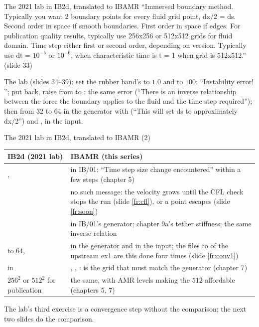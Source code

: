 \documentclass[aspectratio=169,11pt]{beamer}
\begin{document}
\begin{frame}[fragile]{The 2021 lab in IB2d, translated to IBAMR}
\label{fr:lab}
\footnotesize ``Immersed boundary method. Typically you want 2 boundary points for every fluid grid point, dx/2 = ds. Second order in space if smooth boundaries. First order in space if edges. For publication quality results, typically use 256x256 or 512x512 grids for fluid domain. Time step either first or second order, depending on version. Typically use dt = $10^{-5}$ or $10^{-6}$, when characteristic time is t = 1 when grid is 512x512.'' (slide 33)
\vspace{1mm}

\footnotesize The lab (slides 34--39): set the rubber band's  to $1.0$ and  to $100$: ``Instability error! ''; put  back, raise  from  to : the same error (``There is an inverse relationship between the force the boundary applies to the fluid and the time step required''); then  from $32$ to $64$ in the generator with  (``This will set ds to approximately dx/2'') and ,  in the input.

\end{frame}

\begin{frame}[fragile]{The 2021 lab in IB2d, translated to IBAMR (2)}
\label{fr:lab2}
\scriptsize
\setlength{\tabcolsep}{3pt}
\begin{tabular}{@{}L{0.42\textwidth}L{0.52\textwidth}@{}}
\toprule
IB2d (2021 lab) & IBAMR (this series)\\
\midrule
{},  &  in IB/01: ``Time step size change encountered'' within a few steps (chapter 5)\\
 & no such message: the velocity grows until the CFL check stops the run (slide \ref{fr:cfl}), or a point escapes (slide \ref{fr:soon})\\
 &  in IB/01's generator; chapter 9a's tether stiffness; the same inverse relation\\
 to $64$,  &  in the generator and  in the input; the files  to  of the upstream ex1 are this done four times (slide \ref{fr:conv1})\\
 in  & , , :  is the grid that must match the generator (chapter 7)\\
$256^2$ or $512^2$ for publication & the same, with AMR levels making the $512$ affordable (chapters 5, 7)\\
\bottomrule
\end{tabular}
\vspace{1mm}

\scriptsize The lab's third exercise is a convergence step without the comparison; the next two slides do the comparison.
\end{frame}
\end{document}
